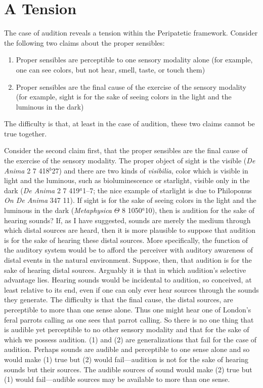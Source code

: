 
\section{A Tension} %
\label{sec:a_tension}

The case of audition reveals a tension within the Peripatetic framework. Consider the following two claims about the proper sensibles:
\begin{enumerate}[(1)]
	\item Proper sensibles are perceptible to one sensory modality alone (for example, one can see colors, but not hear, smell, taste, or touch them)
	\item Proper sensibles are the final cause of the exercise of the sensory modality (for example, sight is for the sake of seeing colors in the light and the luminous in the dark)
\end{enumerate}
The difficulty is that, at least in the case of audition, these two claims cannot be true together.

Consider the second claim first, that the proper sensibles are the final cause of the exercise of the sensory modality. The proper object of sight is the visible (\emph{De Anima} 2 7 418\( ^{b} \)27) and there are two kinds of \emph{visibilia}, color which is visible in light and the luminous, such as bioluminescence or starlight, visible only in the dark (\emph{De Anima} 2 7 419\( ^{a} \)1--7; the nice example of starlight is due to Philoponus  \emph{On \emph{De Anima}} 347 11). If sight is for the sake of seeing colors in the light and the luminous in the dark (\emph{Metaphysica} \( \Theta \) 8 1050\( ^{a} \)10), then is audition for the sake of hearing sounds? If, as I have suggested, sounds are merely the medium through which distal sources are heard, then it is more plausible to suppose that audition is for the sake of hearing these distal sources. More specifically, the function of the auditory system would be to afford the perceiver with auditory awareness of distal events in the natural environment. Suppose, then, that audition is for the sake of hearing distal sources. Arguably it is that in which audition's selective advantage lies. Hearing sounds would be incidental to audition, so conceived, at least relative to its end, even if one can only ever hear sources through the sounds they generate. The difficulty is that the final cause, the distal sources, are perceptible to more than one sense alone. Thus one might hear one of London's feral parrots calling as one sees that parrot calling. So there is no one thing that is audible yet perceptible to no other sensory modality and that for the sake of which we possess audition. (1) and (2) are generalizations that fail for the case of audition. Perhaps sounds are audible and perceptible to one sense alone and so would make (1) true but (2) would fail---audition is not for the sake of hearing sounds but their sources. The audible sources of sound would make (2) true but (1) would fail---audible sources may be available to more than one sense. 

